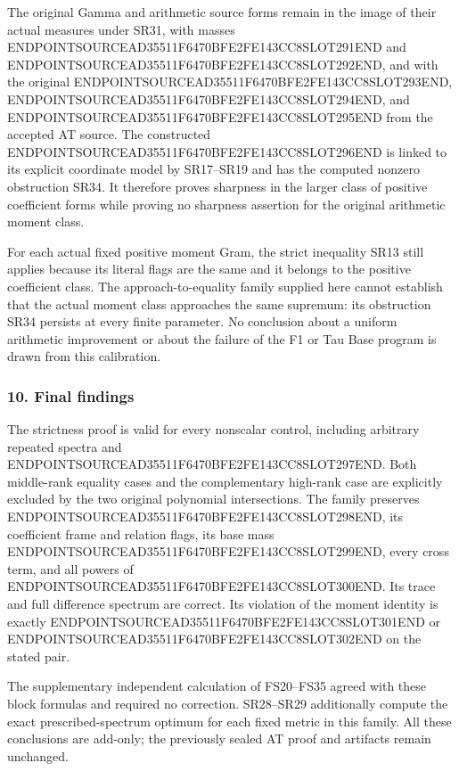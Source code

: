 The original Gamma and arithmetic source forms remain in the image of their actual measures under SR31, with masses ENDPOINTSOURCEAD35511F6470BFE2FE143CC8SLOT291END and ENDPOINTSOURCEAD35511F6470BFE2FE143CC8SLOT292END, and with the original ENDPOINTSOURCEAD35511F6470BFE2FE143CC8SLOT293END, ENDPOINTSOURCEAD35511F6470BFE2FE143CC8SLOT294END, and ENDPOINTSOURCEAD35511F6470BFE2FE143CC8SLOT295END from the accepted AT source. The constructed ENDPOINTSOURCEAD35511F6470BFE2FE143CC8SLOT296END is linked to its explicit coordinate model by SR17--SR19 and has the computed nonzero obstruction SR34. It therefore proves sharpness in the larger class of positive coefficient forms while proving no sharpness assertion for the original arithmetic moment class.

For each actual fixed positive moment Gram, the strict inequality SR13 still applies because its literal flags are the same and it belongs to the positive coefficient class. The approach-to-equality family supplied here cannot establish that the actual moment class approaches the same supremum: its obstruction SR34 persists at every finite parameter. No conclusion about a uniform arithmetic improvement or about the failure of the F1 or Tau Base program is drawn from this calibration.

\subsubsection{10. Final findings}\label{endpoint-four_window_sharpness_review--final-findings}

The strictness proof is valid for every nonscalar control, including arbitrary repeated spectra and ENDPOINTSOURCEAD35511F6470BFE2FE143CC8SLOT297END. Both middle-rank equality cases and the complementary high-rank case are explicitly excluded by the two original polynomial intersections. The family preserves ENDPOINTSOURCEAD35511F6470BFE2FE143CC8SLOT298END, its coefficient frame and relation flags, its base mass ENDPOINTSOURCEAD35511F6470BFE2FE143CC8SLOT299END, every cross term, and all powers of ENDPOINTSOURCEAD35511F6470BFE2FE143CC8SLOT300END. Its trace and full difference spectrum are correct. Its violation of the moment identity is exactly ENDPOINTSOURCEAD35511F6470BFE2FE143CC8SLOT301END or ENDPOINTSOURCEAD35511F6470BFE2FE143CC8SLOT302END on the stated pair.

The supplementary independent calculation of FS20--FS35 agreed with these block formulas and required no correction. SR28--SR29 additionally compute the exact prescribed-spectrum optimum for each fixed metric in this family. All these conclusions are add-only; the previously sealed AT proof and artifacts remain unchanged.
